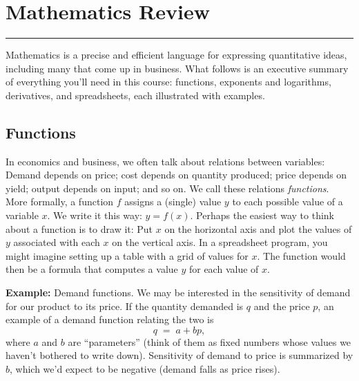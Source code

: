 \chapter{Mathematics Review}\label{chp:math}
\hypertarget{math}{}


\rule{\textwidth}{1pt}

Mathematics is a precise and efficient language for expressing quantitative ideas,
including many that come up in business.
What follows is an executive summary of everything you'll need in this course:
functions, exponents and logarithms, derivatives, and spreadsheets,
each illustrated with examples.


\section{Functions}

In economics and business, we often talk about relations between
variables: Demand depends on price; cost depends on quantity
produced; price depends on yield; output depends on input; and so
on. We call these relations {\it functions\/}.  More formally, a
function $f$ assigns a (single) value $y$ to each possible value
of a variable $x$.
We write it this way: $y = f(x)$. Perhaps the
easiest way to think about a function is to draw it: Put $x$ on
the horizontal axis and plot the values of $y$ associated with
each $x$ on the vertical axis. In a spreadsheet program, you might
imagine setting up a table with a grid of values for $x$. The
function would then be a formula that computes a value $y$ for
each value of $x$.



\textbf{Example:} Demand functions. 
We may be interested in the sensitivity of demand for our product to its price.
If the quantity demanded is $q$ and the price $p$,
an example of a  demand function relating the two is
\[
    q \;=\; a + b p ,
\]
where $a$ and $b$ are ``parameters''
(think of them as fixed numbers whose values we haven't bothered to write down).
Sensitivity of demand to price is summarized by $b$,
which we'd expect to be negative (demand falls as price rises).


